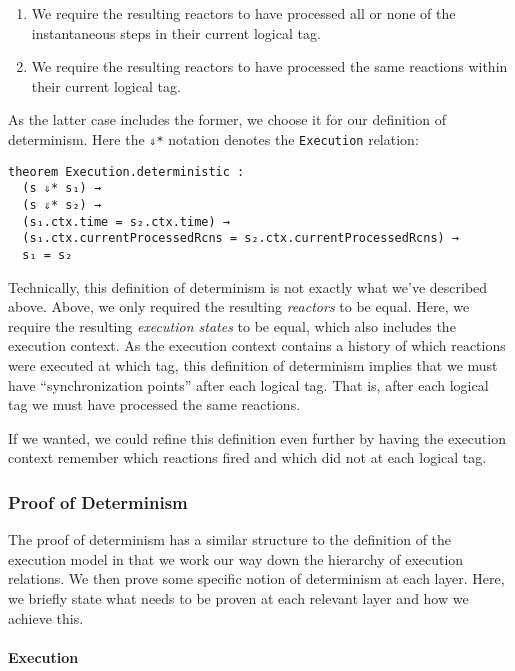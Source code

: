 \begin{enumerate}
  \item We require the resulting reactors to have processed all or none of the instantaneous steps in their current logical tag.
  \item We require the resulting reactors to have processed the same reactions within their current logical tag.
\end{enumerate}

As the latter case includes the former, we choose it for our definition of determinism.
Here the \lstinline{⇓*} notation denotes the \lstinline{Execution} relation:

\begin{lstlisting}
theorem Execution.deterministic : 
  (s ⇓* s₁) → 
  (s ⇓* s₂) → 
  (s₁.ctx.time = s₂.ctx.time) → 
  (s₁.ctx.currentProcessedRcns = s₂.ctx.currentProcessedRcns) → 
  s₁ = s₂
\end{lstlisting}

Technically, this definition of determinism is not exactly what we've described above.
Above, we only required the resulting \emph{reactors} to be equal.
Here, we require the resulting \emph{execution states} to be equal, which also includes the execution context.
As the execution context contains a history of which reactions were executed at which tag, this definition of determinism implies that we must have ``synchronization points'' after each logical tag.
That is, after each logical tag we must have processed the same reactions.

If we wanted, we could refine this definition even further by having the execution context remember which reactions fired and which did not at each logical tag.

\subsubsection{Proof of Determinism}

The proof of determinism has a similar structure to the definition of the execution model in that we work our way down the hierarchy of execution relations.
We then prove some specific notion of determinism at each layer.
Here, we briefly state what needs to be proven at each relevant layer and how we achieve this.

\paragraph{Execution}

